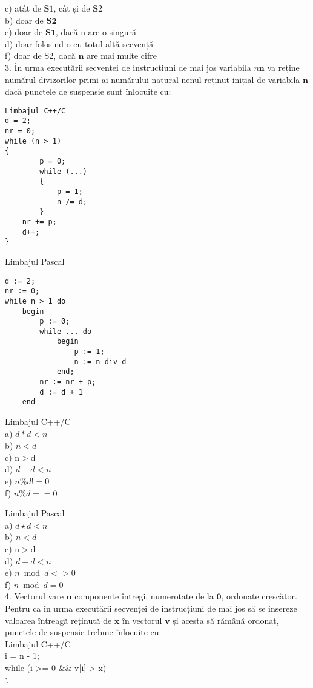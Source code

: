 c) atât de $\mathbf{S} 1$, cât și de $\mathbf{S} 2$\\
b) doar de $\mathbf{S 2}$\\
e) doar de $\mathbf{S 1}$, dacă n are o singură\\
d) doar folosind o cu totul altă secvență\\
f) doar de S2, dacă $\mathbf{n}$ are mai multe cifre\\
3. În urma executării secvenței de instrucțiuni de mai jos variabila $n \boldsymbol{n}$ va reține numărul divizorilor primi ai numărului natural nenul reținut inițial de variabila $\mathbf{n}$ dacă punctele de suspensie sunt înlocuite cu:

\begin{verbatim}
Limbajul C++/C
d = 2;
nr = 0;
while (n > 1)
{
        p = 0;
        while (...)
        {
            p = 1;
            n /= d;
        }
    nr += p;
    d++;
}
\end{verbatim}

Limbajul Pascal

\begin{verbatim}
d := 2;
nr := 0;
while n > 1 do
    begin
        p := 0;
        while ... do
            begin
                p := 1;
                n := n div d
            end;
        nr := nr + p;
        d := d + 1
    end
\end{verbatim}

Limbajul C++/C\\
a) $d * d<n$\\
b) $n<d$\\
c) $\mathrm{n}>\mathrm{d}$\\
d) $d+d<n$\\
e) $n \% d!=0$\\
f) $n \% d==0$

Limbajul Pascal\\
a) $d \star d<n$\\
b) $n<d$\\
c) $\mathrm{n}>\mathrm{d}$\\
d) $d+d<n$\\
e) $n \bmod d<>0$\\
f) $n \bmod d=0$\\
4. Vectorul vare $\mathbf{n}$ componente întregi, numerotate de la $\mathbf{0}$, ordonate crescător. Pentru ca în urma executării secvenței de instrucțiuni de mai jos să se insereze valoarea întreagă reținută de $\mathbf{x}$ în vectorul $\mathbf{v}$ și acesta să rămână ordonat, punctele de suspensie trebuie înlocuite cu:\\
Limbajul C++/C\\
i = n - 1;\\[0pt]
while (i >= 0 \&\& v[i] > x)\\
$\{$

